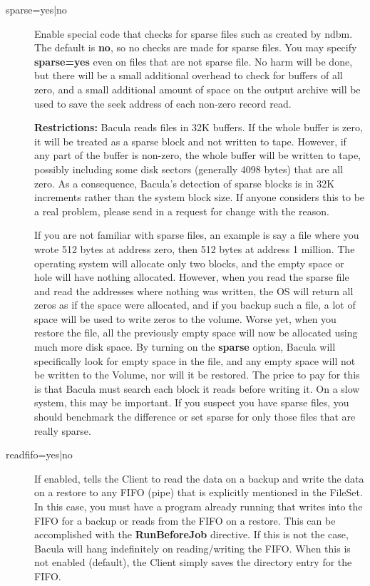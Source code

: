 \begin{description}
\item [sparse=yes|no]
   Enable special code that checks for sparse files such as created by
   ndbm.  The default is {\bf no}, so no checks are made for sparse files.
   You may specify {\bf sparse=yes} even on files that are not sparse file.
   No harm will be done, but there will be a small additional overhead to
   check for buffers of all zero, and a small additional amount of space on
   the output archive will be used to save the seek address of each
   non-zero record read.

   {\bf Restrictions:} Bacula reads files in 32K buffers.  If the whole
   buffer is zero, it will be treated as a sparse block and not written to
   tape.  However, if any part of the buffer is non-zero, the whole buffer
   will be written to tape, possibly including some disk sectors (generally
   4098 bytes) that are all zero.  As a consequence, Bacula's detection of
   sparse blocks is in 32K increments rather than the system block size.
   If anyone considers this to be a real problem, please send in a request
   for change with the reason.

   If you are not familiar with sparse files, an example is say a file
   where you wrote 512 bytes at address zero, then 512 bytes at address 1
   million.  The operating system will allocate only two blocks, and the
   empty space or hole will have nothing allocated.  However, when you read
   the sparse file and read the addresses where nothing was written, the OS
   will return all zeros as if the space were allocated, and if you backup
   such a file, a lot of space will be used to write zeros to the volume.
   Worse yet, when you restore the file, all the previously empty space
   will now be allocated using much more disk space.  By turning on the
   {\bf sparse} option, Bacula will specifically look for empty space in
   the file, and any empty space will not be written to the Volume, nor
   will it be restored.  The price to pay for this is that Bacula must
   search each block it reads before writing it.  On a slow system, this
   may be important.  If you suspect you have sparse files, you should
   benchmark the difference or set sparse for only those files that are
   really sparse.

\label{readfifo}

\item [readfifo=yes|no]
   If enabled, tells the Client to read the data on a backup and write the
   data on a restore to any FIFO (pipe) that is explicitly mentioned in the
   FileSet.  In this case, you must have a program already running that
   writes into the FIFO for a backup or reads from the FIFO on a restore.
   This can be accomplished with the {\bf RunBeforeJob} directive.  If this
   is not the case, Bacula will hang indefinitely on reading/writing the
   FIFO. When this is not enabled (default), the Client simply saves the
   directory entry for the FIFO.


\end{description}
